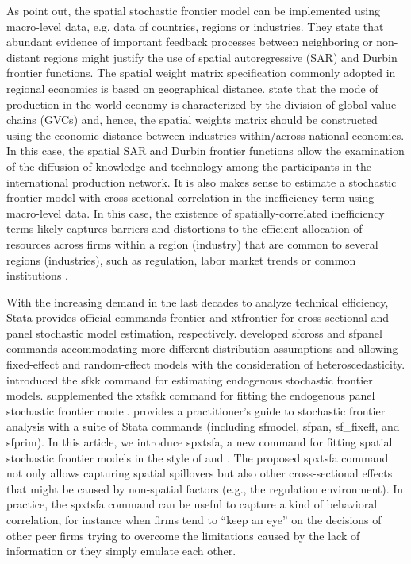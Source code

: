 As \cite{orea2019new} point out, the spatial stochastic frontier model can be implemented using macro-level data, e.g. data of countries, regions or industries. They state that abundant evidence of important feedback processes between neighboring or non-distant regions might justify the use of spatial autoregressive (SAR) and Durbin frontier functions. The spatial weight matrix specification commonly adopted in regional economics is based on geographical distance. \cite{liu2023industry} state that the mode of production in the world economy is characterized by the division of global value chains (GVCs) and, hence, the spatial weights matrix should be constructed using the economic distance between industries within/across national economies. In this case, the spatial SAR and Durbin frontier functions allow the examination of the diffusion of knowledge and technology among the participants in the international production network. It is also makes sense to estimate a stochastic frontier model with cross-sectional correlation in the inefficiency term using macro-level data. In this case, the existence of spatially-correlated inefficiency terms likely captures barriers and distortions to the efficient allocation of resources across firms within a region (industry) that are common to several regions (industries), such as regulation, labor market trends or common institutions \citep{orea2023industry}.  


With the increasing demand in the last decades to analyze technical efficiency, Stata provides official commands frontier and xtfrontier for cross-sectional and panel stochastic model estimation, respectively. \cite{belotti2013stochastic} developed sfcross and sfpanel commands accommodating more different distribution assumptions and allowing fixed-effect and random-effect models with the consideration of heteroscedasticity. \cite{karakaplan2017fitting} introduced the sfkk command for estimating endogenous stochastic frontier models. \cite{mustafaugurkarakaplan2018xtsfkk} supplemented the xtsfkk command for fitting the endogenous panel stochastic frontier model. \cite{kumbhakarpractitioner} provides a practitioner’s guide to stochastic frontier analysis with a suite of Stata commands (including sfmodel, sfpan, sf\_fixeff, and sfprim).
 In this article, we introduce spxtsfa, a new command for fitting spatial stochastic frontier models in the style of \cite{orea2019new} and \cite{galli2022spatial}. The proposed spxtsfa command not only allows capturing spatial spillovers but also other cross-sectional effects that might be caused by non-spatial factors (e.g., the regulation environment). In practice, the spxtsfa command can be useful to capture a kind of behavioral correlation, for instance when firms tend to “keep an eye” on the decisions of other peer firms trying to overcome the limitations caused by the lack of information or they simply emulate each other.  


